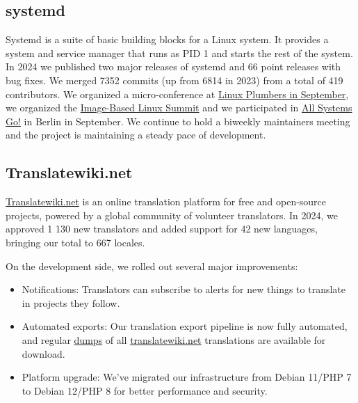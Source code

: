 \documentclass[a4paper]{report}
\begin{document}
\subsection{systemd}

Systemd is a suite of basic building blocks for a Linux system. It provides a system and service manager that runs as PID 1 and starts the rest of the system. In 2024 we published two major releases of systemd and 66 point releases with bug fixes. We merged 7352 commits (up from 6814 in 2023) from a total of 419 contributors. We organized a micro-conference at \href{https://lpc.events/event/18/sessions/206/#20240919}{Linux Plumbers in September}, we organized the \href{https://uapi-group.org/docs/minutes/2024-09-24__image-based-linux-summit/}{Image-Based Linux Summit} and we participated in \href{https://cfp.all-systems-go.io/all-systems-go-2024/schedule/}{All Systems Go!} in Berlin in September. We continue to hold a biweekly maintainers meeting and the project is maintaining a steady pace of development.

\subsection{Translatewiki.net}

\href{https://translatewiki.net/}{Translatewiki.net} is an online translation platform for free and open-source projects, powered by a global community of volunteer translators. In 2024, we approved 1 130 new translators and added support for 42 new languages, bringing our total to 667 locales.

On the development side, we rolled out several major improvements:

\begin{itemize}

\item Notifications: Translators can subscribe to alerts for new things to translate in projects they follow.
\item Automated exports: Our translation export pipeline is now fully automated, and regular \href{https://translatewiki.net/wiki/Dumps}{dumps} of all \href{https://translatewiki.net/}{translatewiki.net} translations are available for download.
\item Platform upgrade: We’ve migrated our infrastructure from Debian 11/PHP 7 to Debian 12/PHP 8 for better performance and security.

\end{itemize}
\end{document}
